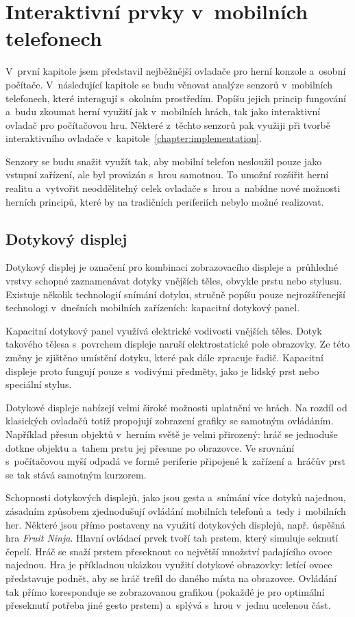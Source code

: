 \documentclass[thesis=B,czech,hidelinks]{FITthesis}[2012/06/26] %
\begin{document}
\chapter{Interaktivní prvky v~mobilních telefonech}

V~první kapitole jsem představil nejběžnější ovladače pro herní konzole a~osobní počítače. V~následující kapitole se budu věnovat analýze senzorů v~mobilních telefonech, které interagují s~okolním prostředím. Popíšu jejich princip fungování a~budu zkoumat herní využití jak v~mobilních hrách, tak jako interaktivní ovladač pro počítačovou hru. Některé z~těchto senzorů pak využiji při tvorbě interaktivního ovladače v~kapitole~\ref{chapter:implementation}.

Senzory se budu snažit využít tak, aby mobilní telefon nesloužil pouze jako vstupní zařízení, ale byl provázán s~hrou samotnou. To umožní rozšířit herní realitu a~vytvořit neoddělitelný celek ovladače s~hrou a~nabídne nové možnosti herních principů, které by na tradičních periferiích nebylo možné realizovat.

\section{Dotykový displej}
\label{section:touchscreen}

Dotykový displej je označení pro kombinaci zobrazovacího displeje a~průhledné vrstvy schopné zaznamenávat dotyky vnějších těles, obvykle prstu nebo stylusu. Existuje několik technologií snímání dotyku, stručně popíšu pouze nejrozšířenejší technologi v~dnešních mobilních zařízeních: kapacitní dotykový panel.

Kapacitní dotykový panel využívá elektrické vodivosti vnějších těles. Dotyk takového tělesa s~povrchem displeje naruší elektrostatické pole obrazovky. Ze této změny je zjištěno umístění dotyku, které pak dále zpracuje řadič. Kapacitní displeje proto fungují pouze s~vodivými předměty, jako je lidský prst nebo speciální stylus. \cite{gray2013does}

Dotykové displeje nabízejí velmi široké možnosti uplatnění ve hrách. Na rozdíl od klasických ovladačů totiž propojují zobrazení grafiky se samotným ovládáním. Například přesun objektů v~herním světě je velmi přirozený: hráč se jednoduše dotkne objektu a~tahem prstu jej přesune po obrazovce. Ve srovnání s~počítačovou myší odpadá  ve formě periferie připojené k~zařízení a~hráčův prst se tak stává samotným kurzorem.

Schopnosti dotykových displejů, jako jsou gesta a~snímání více dotyků najednou, zásadním způsobem zjednodušují ovládání mobilních telefonů a~tedy i~mobilních her. Některé jsou přímo postaveny na využití dotykových displejů, např. úspěšná hra \textit{Fruit Ninja}\cite{fruitninja}. Hlavní ovládací prvek tvoří tah prstem, který simuluje seknutí čepelí. Hráč se snaží prstem přeseknout co největší množství padajícího ovoce najednou. Hra je příkladnou ukázkou využití dotykové obrazovky: letící ovoce představuje podnět, aby se hráč trefil do daného místa na obrazovce. Ovládání tak přímo koresponduje se zobrazovanou grafikou (pokaždé je pro optimální přeseknutí potřeba jiné gesto prstem) a~splývá s~hrou v~jednu ucelenou část.
\end{document}
